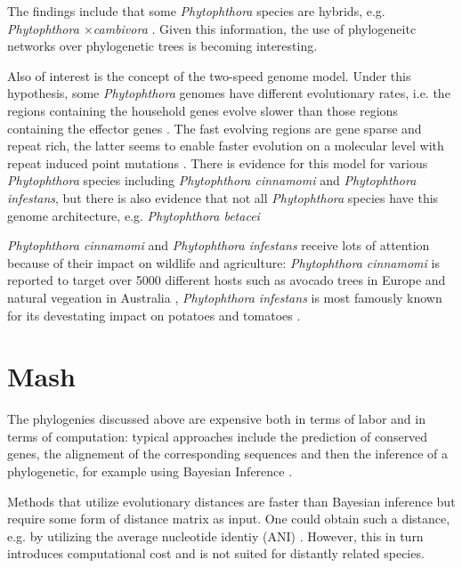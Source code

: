 The findings include that some \textit{Phytophthora} species are
hybrids, e.g. \textit{Phytophthora $\times$cambivora}
\cite{jungSixNewPhytophthora2017,vanpouckeUnravellingHybridizationPhytophthora2021}.
Given this information, the use of phylogeneitc networks over phylogenetic trees
is becoming interesting. 

Also of interest is the concept of the two-speed genome model. Under this
hypothesis, some \textit{Phytophthora} genomes have different evolutionary
rates, i.e. the regions containing the household genes evolve slower than those
regions containing the effector genes \cite{dongTwospeedGenomesFilamentous2015}.
The fast evolving regions are gene sparse and repeat rich, the latter seems to
enable faster evolution on a molecular level with repeat induced point mutations
\cite{dongTwospeedGenomesFilamentous2015}. There is evidence for this model for
various \textit{Phytophthora} species including \textit{Phytophthora cinnamomi}
\cite{engelbrechtGenomeDestructiveOomycete2021} and \textit{Phytophthora
infestans}\cite{ayala-usmaWholeGenomeDuplication2021,dongTwospeedGenomesFilamentous2015},
but there is also evidence that not all \textit{Phytophthora} species have this
genome architecture, e.g. \textit{Phytophthora betacei}
\cite{ayala-usmaWholeGenomeDuplication2021}

\textit{Phytophthora cinnamomi} and \textit{Phytophthora infestans} receive lots
of attention because of their impact on wildlife and agriculture:
\textit{Phytophthora cinnamomi} is reported to target over 5000 different hosts
such as avocado trees in Europe and natural vegeation in Australia
\cite{hardhamPhytophthoraCinnamomi2018,solis-garciaPhytophthoraRootRot2020},
\textit{Phytophthora infestans} is most famously known for its devestating
impact on potatoes and tomatoes \cite{ayala-usmaWholeGenomeDuplication2021}.


\section{Mash}
The phylogenies discussed above are expensive both in terms of labor and in
terms of computation: typical approaches include the prediction of conserved
genes, the alignement of the corresponding sequences and then the inference of a
phylogenetic, for example using Bayesian Inference
\cite{abadPhytophthoraTaxonomicPhylogenetic2023a,winkworthComparativeAnalysesComplete2022}.

Methods that utilize evolutionary distances
\cite{saitouNeighborjoiningMethodNew1987} are faster  than Bayesian
inference but require some form of distance matrix as input. One could obtain
such a distance, e.g. by utilizing the average nucleotide identiy (ANI)
\cite{leeOrthoANIImprovedAlgorithm2016}. However, this in turn introduces
computational cost and is not suited for distantly related species.

